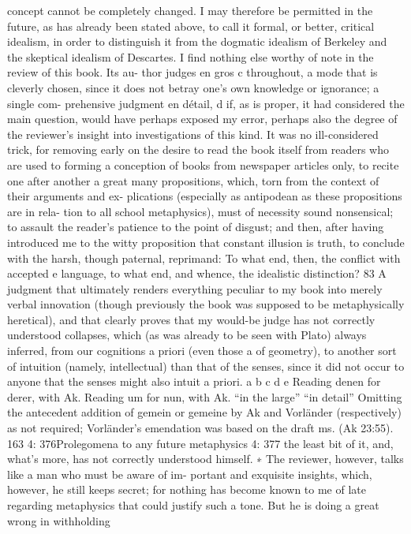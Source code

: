 concept cannot be completely changed. I may therefore be permitted in
the future, as has already been stated above, to call it formal, or better,
critical idealism, in order to distinguish it from the dogmatic idealism of
Berkeley and the skeptical idealism of Descartes.
I ﬁnd nothing else worthy of note in the review of this book. Its au-
thor judges en gros c throughout, a mode that is cleverly chosen, since
it does not betray one’s own knowledge or ignorance; a single com-
prehensive judgment en détail, d if, as is proper, it had considered the
main question, would have perhaps exposed my error, perhaps also the
degree of the reviewer’s insight into investigations of this kind. It was
no ill-considered trick, for removing early on the desire to read the
book itself from readers who are used to forming a conception of books
from newspaper articles only, to recite one after another a great many
propositions, which, torn from the context of their arguments and ex-
plications (especially as antipodean as these propositions are in rela-
tion to all school metaphysics), must of necessity sound nonsensical;
to assault the reader’s patience to the point of disgust; and then, after
having introduced me to the witty proposition that constant illusion
is truth, to conclude with the harsh, though paternal, reprimand: To
what end, then, the conﬂict with accepted e language, to what end, and
whence, the idealistic distinction? 83 A judgment that ultimately renders
everything peculiar to my book into merely verbal innovation (though
previously the book was supposed to be metaphysically heretical), and
that clearly proves that my would-be judge has not correctly understood
collapses, which (as was already to be seen with Plato) always inferred, from
our cognitions a priori (even those a of geometry), to another sort of intuition
(namely, intellectual) than that of the senses, since it did not occur to anyone
that the senses might also intuit a priori.
a
b
c
d
e
Reading denen for derer, with Ak.
Reading um for nun, with Ak.
“in the large”
“in detail”
Omitting the antecedent addition of gemein or gemeine by Ak and Vorländer (respectively)
as not required; Vorländer’s emendation was based on the draft ms. (Ak 23:55).
163
4: 376Prolegomena to any future metaphysics
4: 377
the least bit of it, and, what’s more, has not correctly understood
himself. ∗
The reviewer, however, talks like a man who must be aware of im-
portant and exquisite insights, which, however, he still keeps secret; for
nothing has become known to me of late regarding metaphysics that
could justify such a tone. But he is doing a great wrong in withholding
